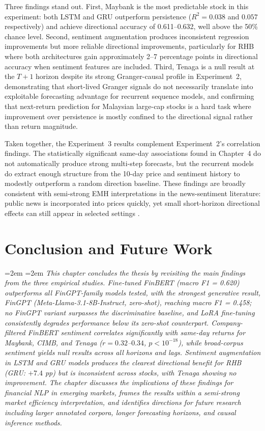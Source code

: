 \documentclass[12pt]{ucetd}
\newcommand{\chapterabstract}[1]{%
  \par\vspace{1em}
  \begingroup
  \leftskip=2em
  \rightskip=2em
  \noindent\itshape
  #1
  \par
  \endgroup
  \vspace{1.5em}
}
\begin{document}
Three findings stand out. First, Maybank is the most predictable stock in this experiment: both LSTM and GRU outperform persistence ($R^2 = 0.038$ and $0.057$ respectively) and achieve directional accuracy of 0.611--0.632, well above the 50\% chance level. Second, sentiment augmentation produces inconsistent regression improvements but more reliable directional improvements, particularly for RHB where both architectures gain approximately 2--7 percentage points in directional accuracy when sentiment features are included. Third, Tenaga is a null result at the $T{+}1$ horizon despite its strong Granger-causal profile in Experiment~2, demonstrating that short-lived Granger signals do not necessarily translate into exploitable forecasting advantage for recurrent sequence models, and confirming that next-return prediction for Malaysian large-cap stocks is a hard task where improvement over persistence is mostly confined to the directional signal rather than return magnitude.

Taken together, the Experiment~3 results complement Experiment~2's correlation findings. The statistically significant same-day associations found in Chapter~4 do not automatically produce strong multi-step forecasts, but the recurrent models do extract enough structure from the 10-day price and sentiment history to modestly outperform a random direction baseline. These findings are broadly consistent with semi-strong EMH interpretations in the news-sentiment literature: public news is incorporated into prices quickly, yet small short-horizon directional effects can still appear in selected settings \cite{tetlock2007giving, bollen2011twitter, davidovic2025news}.




\chapter{Conclusion and Future Work}

\chapterabstract{This chapter concludes the thesis by revisiting the main findings from the three empirical studies. Fine-tuned FinBERT (macro F1 = 0.620) outperforms all FinGPT-family models tested, with the strongest generative result, FinGPT (Meta-Llama-3.1-8B-Instruct, zero-shot), reaching macro F1 = 0.458; no FinGPT variant surpasses the discriminative baseline, and LoRA fine-tuning consistently degrades performance below its zero-shot counterpart. Company-filtered FinBERT sentiment correlates significantly with same-day returns for Maybank, CIMB, and Tenaga ($r = 0.32$--$0.34$, $p < 10^{-18}$), while broad-corpus sentiment yields null results across all horizons and lags. Sentiment augmentation in LSTM and GRU models produces the clearest directional benefit for RHB (GRU: $+7.4$ pp) but is inconsistent across stocks, with Tenaga showing no improvement. The chapter discusses the implications of these findings for financial NLP in emerging markets, frames the results within a semi-strong market efficiency interpretation, and identifies directions for future research including larger annotated corpora, longer forecasting horizons, and causal inference methods.}
\end{document}
